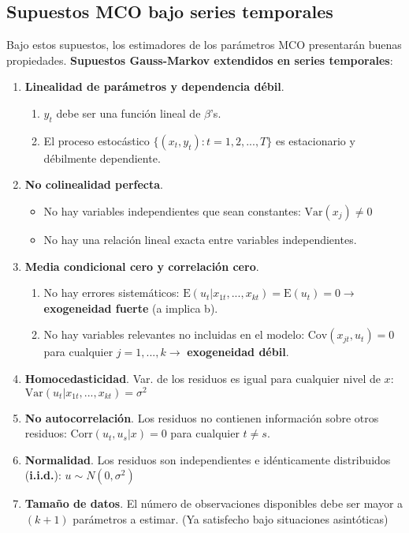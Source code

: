 \documentclass[10pt, a4paper, landscape]{extarticle}
\newcommand{\E}{\mathrm{E}}
\newcommand{\Var}{\mathrm{Var}}
\newcommand{\Cov}{\mathrm{Cov}}
\newcommand{\Corr}{\mathrm{Corr}}
\begin{document}
\begin{multicols}{3}
	\subsection*{Supuestos MCO bajo series temporales}
		Bajo estos supuestos, los estimadores de los parámetros MCO presentarán buenas propiedades. \textbf{Supuestos Gauss-Markov extendidos en series temporales}:
		\begin{enumerate}[leftmargin=*, label=st\arabic*.]
			\item \textbf{Linealidad de parámetros y dependencia débil}.
			\begin{enumerate}[leftmargin=*, label=\alph*.]
				\item $y_t$ debe ser una función lineal de $\beta$'s.
				\item El proceso estocástico $\lbrace(x_t, y_t): t = 1, 2, ..., T\rbrace$ es estacionario y débilmente dependiente.
			\end{enumerate} 
			\item \textbf{No colinealidad perfecta}.
			\begin{itemize}[leftmargin=*]
				\item No hay variables independientes que sean constantes: $\Var(x_j) \neq 0$
				\item No hay una relación lineal exacta entre variables independientes.
			\end{itemize}
			\item \textbf{Media condicional cero y correlación cero}.
			\begin{enumerate}[leftmargin=*, label=\alph*.]
				\item No hay errores sistemáticos: $\E(u_t | x_{1t}, ..., x_{kt}) = \E(u_t) = 0 \rightarrow$ \textbf{exogeneidad fuerte} (a implica b).
				\item No hay variables relevantes no incluidas en el modelo: $\Cov(x_{jt} , u_t) = 0$ para cualquier $j = 1, ..., k \rightarrow$ \textbf{exogeneidad débil}.
			\end{enumerate}
			\item \textbf{Homocedasticidad}. Var. de los residuos es igual para cualquier nivel de $x$: $\Var(u_t | x_{1t}, ..., x_{kt}) = \sigma^2$
			\item \textbf{No autocorrelación}. Los residuos no contienen información sobre otros residuos: $\Corr(u_t, u_s | x) = 0$ para cualquier $t \neq s$.
			\item \textbf{Normalidad}. Los residuos son independientes e idénticamente distribuidos (\textbf{i.i.d.}): $u \sim N(0,\sigma^2)$
			\item \textbf{Tamaño de datos}. El número de observaciones disponibles debe ser mayor a $(k + 1)$ parámetros a estimar. (Ya satisfecho bajo situaciones asintóticas)
		\end{enumerate}	

\end{multicols}
\end{document}
